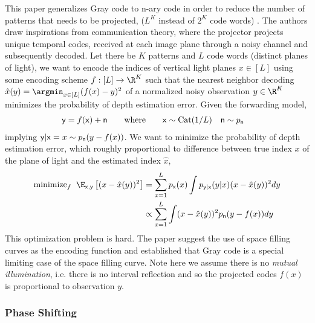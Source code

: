 \documentclass[../writeup.tex]{subfiles}
\begin{document}
This paper generalizes Gray code to n-ary code in order to reduce the number of patterns that needs to be projected, ($L^K$ instead of $2^K$ code words) \cite{hornOptimalStructuredLight1997}. The authors draw inspirations from communication theory, where the projector projects unique temporal codes, received at each image plane through a noisy channel and subsequently decoded. Let there be $K$ patterns and $L$ code words (distinct planes of light), we want to encode the indices of vertical light planes $x\in [L]$ using some encoding scheme $f:[L] \to \R^K$ such that the nearest neighbor decoding $\hat{x}(y) = \argmin_{x\in [L]} ( f(x)-y )^2$ of a normalized noisy observation $y\in\R^K$ minimizes the probability of depth estimation error. Given the forwarding model,
\begin{align*}
    \mathsf{y} = f(\mathsf{x}) + \mathsf{n}
    \quad\quad\text{where}\quad\quad
    \mathsf{x} 
        &\sim \text{Cat}(1/L)
    \quad
    \mathsf{n}
        \sim p_{\mathsf{n}}
\end{align*}
implying $\mathsf{y}|\mathsf{x}=x\sim p_{\mathsf{n}}(y - f(x))$. We want to minimize the probability of depth estimation error, which roughly proportional to difference between true index $x$ of the plane of light and the estimated index $\hat{x}$,
\begin{align}
    \text{minimize}_{f}\;\;
        \E_{\rx,\ry} \left[ (x-\hat{x}(y))^2\right]
        &= \sum_{x=1}^L p_{\rx}(x) \int p_{\ry|\rx}(y|x) (x - \hat{x}(y))^2 dy \\
        &\propto \sum_{x=1}^L \int (x-\hat{x}(y))^2 p_{\rn}(y-f(x)) dy
\end{align}
This optimization problem is hard. The paper suggest the use of space filling curves as the encoding function and established that Gray code is a special limiting case of the space filling curve. Note here we assume there is no \textit{mutual illumination}, i.e. there is no interval reflection and so the projected codes $f(x)$ is proportional to observation $y$. 

\subsubsection{Phase Shifting}
\end{document}
